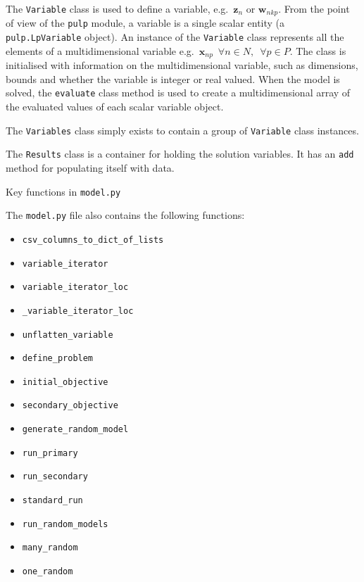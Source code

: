 The \texttt{Variable} class is used to define a variable, e.g.\
$\boldsymbol{z}_{n}$ or $\boldsymbol{w}_{nkp}$. 
From the point of view of the \texttt{pulp} module, a variable is a single
scalar entity (a \texttt{pulp.LpVariable} object).
An instance of the \texttt{Variable} class represents all the elements of a 
multidimensional variable e.g.\
$\boldsymbol{x}_{np} \enspace \forall n \in N, \enspace \forall p \in P$.
The class is initialised with information on the multidimensional variable,
such as dimensions, bounds and whether the variable is integer or real valued.
When the model is solved, the \texttt{evaluate} class method is used to create
a multidimensional array of the evaluated values of each scalar variable
object.

The \texttt{Variables} class simply exists to contain a group of
\texttt{Variable} class instances.

The \texttt{Results} class is a container for holding the solution variables.
It has an \texttt{add} method for populating itself with data.

\vspace{1cm}
{\Large Key functions in \texttt{model.py}}

The \texttt{model.py} file also contains the following functions:
\begin{itemize}
    \item \texttt{csv\_columns\_to\_dict\_of\_lists}
    \item \texttt{variable\_iterator}
    \item \texttt{variable\_iterator\_loc}
    \item \texttt{\_variable\_iterator\_loc}
    \item \texttt{unflatten\_variable}
    \item \texttt{define\_problem}
    \item \texttt{initial\_objective}
    \item \texttt{secondary\_objective}
    \item \texttt{generate\_random\_model}
    \item \texttt{run\_primary}
    \item \texttt{run\_secondary}
    \item \texttt{standard\_run}
    \item \texttt{run\_random\_models}
    \item \texttt{many\_random}
    \item \texttt{one\_random}    
\end{itemize}

